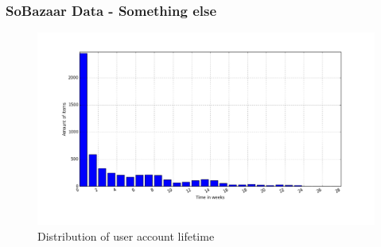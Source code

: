 \documentclass{beamer}
\begin{document}
  \begin{frame}
    \frametitle{SoBazaar Data - Something else}
    \begin{figure}[H]
        \includegraphics[scale=0.3]{../src/image/itemTimespansdistribution.png}
        \centering
        \caption{Distribution of user account lifetime}
    \end{figure}
  \end{frame}
\end{document}
